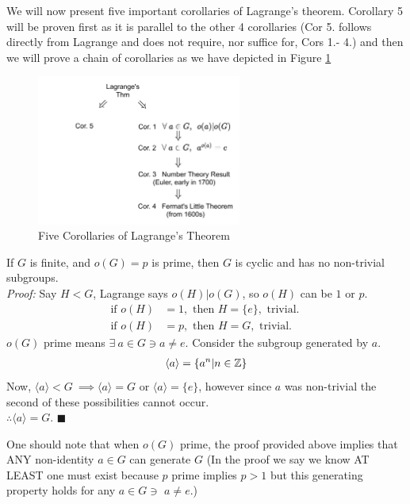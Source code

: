 We will now present five important corollaries of Lagrange's theorem. Corollary 5 will be proven first as it is parallel to the other 4 corollaries (Cor 5. follows directly from Lagrange and does not require, nor suffice for, Cors 1.- 4.) and then we will prove a chain of corollaries as we have depicted in Figure \ref{fig:Lagrange_corrs}
\begin{figure}[ht!]
    \centering
    \includegraphics[width=0.6\textwidth]{Figures/Lagrange_corrollaries.pdf}
    \vspace{-0.1in}\caption{Five Corollaries of Lagrange's Theorem}
    \label{fig:Lagrange_corrs}
\end{figure}
\newpage
\setcounter{dummy_lemma}{0}
\begin{corollary} 
If $G$ is finite, and $o(G)=p$ is prime, then $G$ is cyclic and has no non-trivial subgroups. \\
\textit{Proof:} Say $H<G$, Lagrange says $o(H)|o(G)$, so $o(H)$ can be $1$ or $p$.
\begin{align}
    \text{if }o(H)&=1, \text{ then } H=\{e\}, \text{ trivial.} \ \nonumber\\
    \text{if }o(H)&=p, \text{ then } H=G, \text{ trivial.} \ \nonumber
\end{align}
$o(G)$ prime means $\exists \ a\in G\ni a\neq e$. Consider the subgroup generated by $a$.
\begin{align}
    \langle a \rangle= \{a^n|n\in {\mathbb{ Z}}\}\nonumber
\end{align}
Now, $\langle a \rangle < G \ \implies \langle a \rangle= G$ or $\langle a \rangle =\{e \}$, however since $a$ was non-trivial the second of these possibilities cannot occur.\\
$\therefore \langle a \rangle = G$. $\blacksquare$
\end{corollary}
One should note that when $o(G)$ prime, the proof provided above implies that ANY non-identity $a\in G$ can generate $G$ (In the proof we say we know AT LEAST one must exist because $p$ prime implies $p>1$ but this generating property holds for any $a\in G\ni$  $a\neq e$.)

